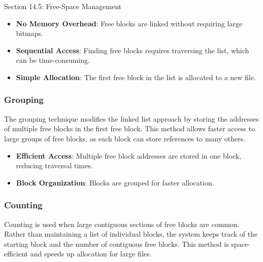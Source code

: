 \begin{notes}{Section 14.5: Free-Space Management}
    \begin{highlight}
    
        \begin{itemize}
            \item \textbf{No Memory Overhead}: Free blocks are linked without requiring large bitmaps.
            \item \textbf{Sequential Access}: Finding free blocks requires traversing the list, which can be time-consuming.
            \item \textbf{Simple Allocation}: The first free block in the list is allocated to a new file.
        \end{itemize}
    
    \end{highlight}
    
    \subsubsection*{Grouping}
    
    The grouping technique modifies the linked list approach by storing the addresses of multiple free blocks in the first free block. This method allows faster access to large groups of free blocks, as 
    each block can store references to many others.
    
    \begin{highlight}[Grouping]
    
        \begin{itemize}
            \item \textbf{Efficient Access}: Multiple free block addresses are stored in one block, reducing traversal times.
            \item \textbf{Block Organization}: Blocks are grouped for faster allocation.
        \end{itemize}
    
    \end{highlight}
    
    \subsubsection*{Counting}
    
    Counting is used when large contiguous sections of free blocks are common. Rather than maintaining a list of individual blocks, the system keeps track of the starting block and the number of contiguous 
    free blocks. This method is space-efficient and speeds up allocation for large files.
    

\end{notes}
